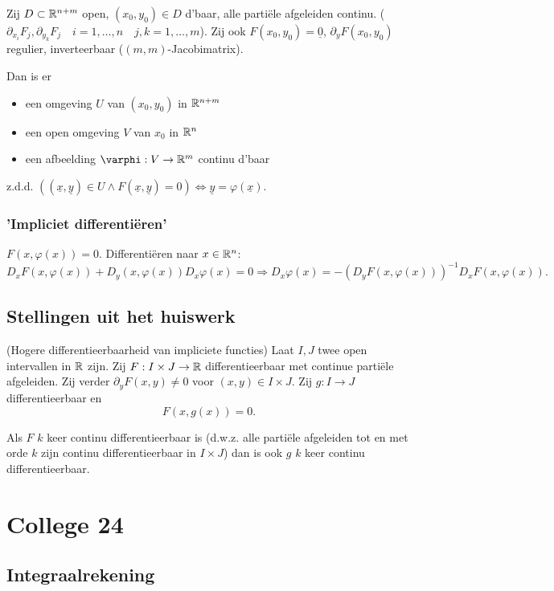 \documentclass{2wa40summary}
\begin{document}
				 Zij $ D\subset \mathbb{R}^{n+m} $ open, $ (x_0, y_0) \in D $ d'baar, alle parti\"ele afgeleiden continu. ($ \partial_{x_i}F_j , \partial_{y_k}F_j \quad i=1,\dots,n \quad j,k=1,\dots,m $). Zij ook $ F(x_0, y_0) = \underline{0}$, $ \partial_y F(x_0,y_0) $ regulier, inverteerbaar ($ (m,m) $-Jacobimatrix).
				
				Dan is er \begin{itemize}
					\item[] een omgeving $ U $ van $ (x_0,y_0) $ in $ \mathbb{R}^{n+m} $
					\item[] een open omgeving $V$ van $x_0$ in $\mathbb{R}^n$
					\item[] een afbeelding $ \varphi : V\rightarrow \reals^m $ continu d'baar 
				\end{itemize}
				z.d.d. $ ((\underline{x},\underline{y}) \in U \wedge F(\underline{x},\underline{y})=0) \Leftrightarrow \underline{y}=\varphi (\underline{x}). $
				
			\subsubsection{'Impliciet differenti\"eren'}
				$ F(x,\varphi(x))=0 $. Differenti\"eren naar $ x\in \mathbb{R}^n $:
				\[ D_x F(x,\varphi(x)) + D_y (x,\varphi(x))D_x \varphi(x) = 0 \Rightarrow D_x \varphi(x) = -(D_y F(x,\varphi(x)))^{-1} D_x F(x,\varphi(x)). \]
				
		\subsection{Stellingen uit het huiswerk}
			\theorem (Hogere differentieerbaarheid van impliciete functies)
				Laat $I,J$ twee open intervallen in $ \mathbb{R} $ zijn. Zij $F:I \times J \to \mathbb{R}$ differentieerbaar met continue parti\"ele afgeleiden. Zij verder $\partial_y F(x,y) \neq 0$ voor $(x,y) \in I \times J$. Zij $g:I\to J$ differentieerbaar en \[ F(x,g(x)) = 0. \]
				
				Als $F$ $k$ keer continu differentieerbaar is (d.w.z. alle parti\"ele afgeleiden tot en met orde $k$ zijn continu differentieerbaar in $I \times J$) dan is ook $g$ $k$ keer continu differentieerbaar.		
				
		\newpage		
		\section{College 24}
		\subsection{Integraalrekening} 
\end{document}
